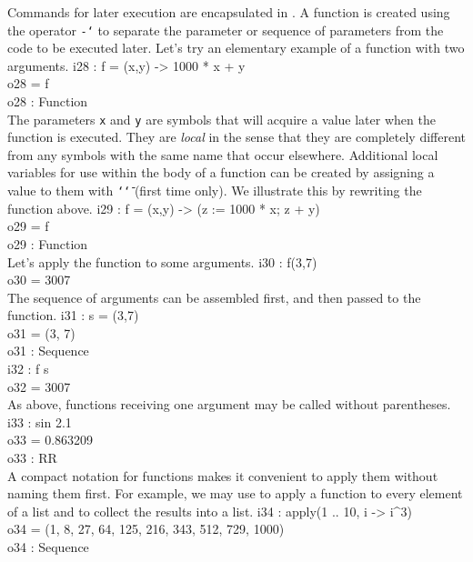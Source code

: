 Commands for later execution are encapsulated in {\sl {}}.  A function
is created using the operator {\tt -\char`\>}\indexcmd{->} to separate the parameter or
sequence of parameters from the code to be executed later.  Let's try an
elementary example of a function with two arguments.
\beginOutput
i28 : f = (x,y) -> 1000 * x + y\\
\emptyLine
o28 = f\\
\emptyLine
o28 : Function\\
\endOutput
The parameters {\tt x} and {\tt y} are symbols that will acquire a
value later when the function is executed.  They are {\sl local} in the sense that
they are completely different from any symbols with the same name that occur
elsewhere.  Additional local variables for use within the body of a function
can be created by assigning a value to them with {\tt \char`\:\char`\=}
\indexcmd{:=}
(first time only).  We illustrate this by rewriting the function above.
\beginOutput
i29 : f = (x,y) -> (z := 1000 * x; z + y)\\
\emptyLine
o29 = f\\
\emptyLine
o29 : Function\\
\endOutput
Let's apply the function to some arguments.
\beginOutput
i30 : f(3,7)\\
\emptyLine
o30 = 3007\\
\endOutput
The sequence of arguments can be assembled first, and then passed to the
function.
\beginOutput
i31 : s = (3,7)\\
\emptyLine
o31 = (3, 7)\\
\emptyLine
o31 : Sequence\\
\endOutput
\beginOutput
i32 : f s\\
\emptyLine
o32 = 3007\\
\endOutput
As above, functions receiving one argument may be called without parentheses.
\beginOutput
i33 : sin 2.1\\
\emptyLine
o33 = 0.863209\\
\emptyLine
o33 : RR\\
\endOutput
A compact notation for functions makes it convenient to apply them
without naming them first.  For example, we may use  to apply a
function to every element of a list and to collect the results into a list.
\beginOutput
i34 : apply(1 .. 10, i -> i^3)\\
\emptyLine
o34 = (1, 8, 27, 64, 125, 216, 343, 512, 729, 1000)\\
\emptyLine
o34 : Sequence\\

